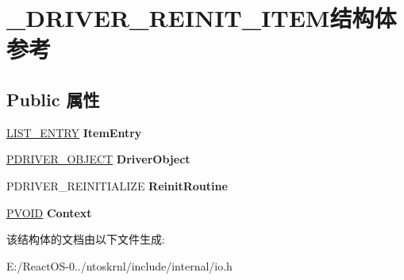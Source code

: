 \hypertarget{struct___d_r_i_v_e_r___r_e_i_n_i_t___i_t_e_m}{}\section{\+\_\+\+D\+R\+I\+V\+E\+R\+\_\+\+R\+E\+I\+N\+I\+T\+\_\+\+I\+T\+E\+M结构体 参考}
\label{struct___d_r_i_v_e_r___r_e_i_n_i_t___i_t_e_m}
\subsection*{Public 属性}
\begin{DoxyCompactItemize}
\item 
\mbox{\label{struct___d_r_i_v_e_r___r_e_i_n_i_t___i_t_e_m_a67ddc56fff3490a6987181b635bf5ca9}} 
\hyperlink{struct___l_i_s_t___e_n_t_r_y}{L\+I\+S\+T\+\_\+\+E\+N\+T\+RY} {\bfseries Item\+Entry}
\item 
\mbox{\label{struct___d_r_i_v_e_r___r_e_i_n_i_t___i_t_e_m_a3a91cc6dbed6f261df13451a2adab515}} 
\hyperlink{struct___d_r_i_v_e_r___o_b_j_e_c_t}{P\+D\+R\+I\+V\+E\+R\+\_\+\+O\+B\+J\+E\+CT} {\bfseries Driver\+Object}
\item 
\mbox{\label{struct___d_r_i_v_e_r___r_e_i_n_i_t___i_t_e_m_a43acd578b834eaf41bcb7f704b188c5b}} 
P\+D\+R\+I\+V\+E\+R\+\_\+\+R\+E\+I\+N\+I\+T\+I\+A\+L\+I\+ZE {\bfseries Reinit\+Routine}
\item 
\mbox{\label{struct___d_r_i_v_e_r___r_e_i_n_i_t___i_t_e_m_ab33c8024bc28782758ec4d1c68528f5f}} 
\hyperlink{interfacevoid}{P\+V\+O\+ID} {\bfseries Context}
\end{DoxyCompactItemize}


该结构体的文档由以下文件生成\+:\begin{DoxyCompactItemize}
\item 
E\+:/\+React\+O\+S-\/0../ntoskrnl/include/internal/io.\+h\end{DoxyCompactItemize}
